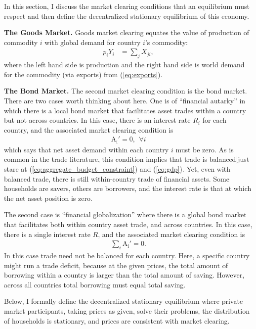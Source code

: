 \documentclass[12pt,pdftex]{article}
\begin{document}
\begin{onehalfspacing}
In this section, I discuss the market clearing conditions that an equilibrium must respect and then define the decentralized stationary equilibrium of this economy.

\textbf{The Goods Market.} Goods market clearing equates the value of production of commodity $i$  with global demand for country $i$'s commodity:
\begin{align}
p_{i} Y_{i} &= \sum_{j}  X_{ji} \label{eq:goods-supply},
\end{align}
where the left hand side is production and the right hand side is world demand for the commodity (via exports) from (\ref{eq:exports}).

\textbf{The Bond Market.} The second market clearing condition is the bond market. There are two cases worth thinking about here. One is of ``financial autarky'' in which there is a local bond market that facilitates asset trades within a country but not across countries. In this case, there is an interest rate $R_i$ for each country, and the associated market clearing condition is
\begin{align}
\mathrm{A_i'} = 0, \ \ \forall i
\label{eq:bond-market-country}
\end{align}
which says that net asset demand within each country $i$ must be zero. As is common in the trade literature, this condition implies that trade is balanced|just stare at (\ref{eq:aggregate_budget_constraint}) and (\ref{eq:gdp}). Yet, even with balanced trade, there is still within-country trade of financial assets. Some households are savers, others are borrowers, and the interest rate is that at which the net asset position is zero.

The second case is ``financial globalization'' where there is a global bond market that facilitates both within country asset trade, and across countries. In this case, there is a single interest rate $R$, and the associated market clearing condition is
\begin{align}
\sum_{i}\mathrm{A_i'} = 0.
\label{eq:bond-market-globalization}
\end{align}
In this case trade need not be balanced for each country. Here, a specific country might run a trade deficit, because at the given prices, the total amount of borrowing within a country is larger than the total amount of saving. However, across all countries total borrowing must equal total saving.

Below, I formally define the decentralized stationary equilibrium where private market participants, taking prices as given, solve their problems, the distribution of households is stationary, and prices are consistent with market clearing.


\end{onehalfspacing}
\end{document}
